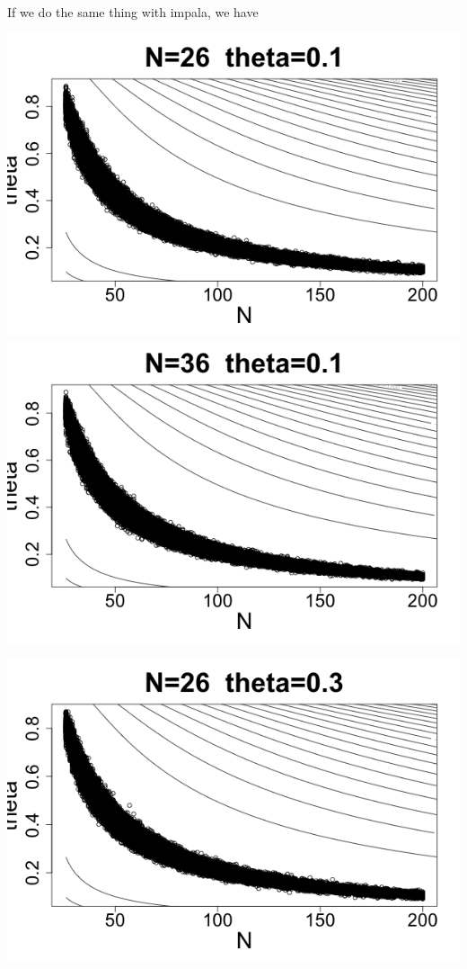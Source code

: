 \documentclass[letterpaper,10pt]{amsart}
\begin{document}
\begin{enumerate}[{1}.1]
If we do the same thing with impala, we have
\begin{center}
\includegraphics[scale=0.25]{Stat221Impala1.png}
\includegraphics[scale=0.25]{Stat221Impala6.png}
\end{center}
\begin{center}
\includegraphics[scale=0.25]{Stat221Impala2.png}

\end{center}
\end{enumerate}
\end{document}
